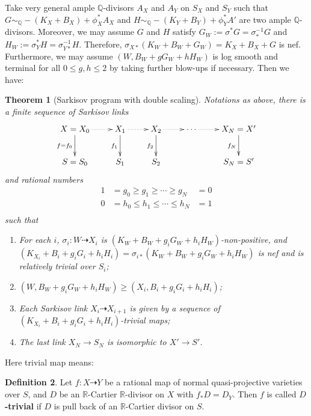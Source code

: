 \documentclass[11pt]{amsart}
\numberwithin{equation}{section}
\newtheorem{thm}{Theorem}[subsection]
\theoremstyle{definition}
\newtheorem{defn}[thm]{Definition}
\theoremstyle{definition}
\theoremstyle{definition}
\begin{document}
Take  very general ample $\mathbb{Q}$-divisors $ A_{X} $ and $ A_{Y} $ on $ S_{X} $ and $ S_{Y} $ such that $ G\sim_{\mathbb{Q}}-(K_X+B_{X})+\phi_{X}^*A_{X} $ and $ H\sim_{\mathbb{Q}}-(K_{Y}+B_{Y})+\phi_{Y}^{*}A' $ are two ample $\mathbb{Q}$-divisors. Moreover, we may assume $ G $ and $ H $ satisfy $G_{W}:= \sigma^*G=\sigma^{-1}_*G $ and $ H_{W}:=\sigma_{Y}^{*}H=\sigma_{Y*}^{-1}H $. Therefore, $\sigma_{X*}(K_{W}+B_{W}+G_{W})=K_{X}+B_{X}+G$ is nef. Furthermore, we may assume $(W, B_W+gG_W+hH_W)$ is log smooth and terminal for all $0\leqslant g,h\leqslant 2$ by taking further blow-ups if necessary. Then we have:
\begin{thm}[Sarkisov program with double scaling]\label{thm: double scaling}
  \cite[Claim 13.12]{haconMinimalModelProgram2012}
  Notations as above, there is a finite sequence of Sarkisov links
  \[
    \xymatrix{
    X=X_0\ar@{.>}[r]\ar[d]_{f=f_{0}}&X_{1}\ar@{.>}[r]\ar[d]_{f_{1}}& X_{2}\ar[d]_{f_{2}}\ar@{.>}[r] &\cdots\ar@{.>}[r]&X_N=X'\ar[d]_{f_{N}} \\
    S=S_{0}&S_{1} &S_{2}&&S_N=S'
    }
  \]
  and rational numbers
  \[
    \begin{aligned}
      1 & =g_0\geqslant g_1 \geqslant \cdots \geqslant g_N   & =0 \\
      0 & =h_0\leqslant h_{1} \leqslant \cdots \leqslant h_N & =1 \\
    \end{aligned}
  \]
  such that
  \begin{enumerate}
    \item For each $i$, $\sigma_i:W\dashrightarrow  X_{i}$ is $(K_{W}+B_{W}+g_{i}G_{W}+h_{i}H_{W})$-non-positive, and $(K_{X_{i}}+B_{i}+g_{i}G_{i}+h_{i}H_{i})=\sigma_{i*}(K_{W}+B_{W}+g_{i}G_{W}+h_{i}H_{W})$ is nef and is relatively trivial over $S_{i}$;
    \item $(W,B_{W}+g_{i}G_{W}+h_{i}H_{W})\geqslant (X_{i},B_{i}+g_{i}G_{i}+h_{i}H_{i})$;
    \item Each Sarkisov link $X_{i}\dashrightarrow X_{i+1}$ is given by a sequence of $(K_{X_{i}}+B_{i}+g_{i}G_{i}+h_{i}H_{i})$-trivial maps;
    \item  The last link $X_{N} \to S_{N}$ is isomorphic to $X'\to S'$.
  \end{enumerate}
\end{thm}
Here trivial map means:
\begin{defn}\label{trivialmap}
  \cite[\S 13.2]{haconMinimalModelProgram2012} Let $f:X\dashrightarrow Y$ be a rational map of normal quasi-projective varieties over $S$, and $D$ be an $\mathbb{R}$-Cartier $\mathbb{R}$-divisor  on $X$ with $f_*D=D_Y$. Then $f$ is called \textbf{$D$-trivial} if $D$ is pull back of an $\mathbb{R}$-Cartier divisor on $S$.
\end{defn}
\end{document}
